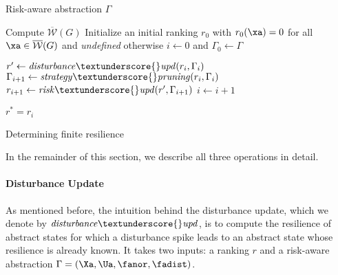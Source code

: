 \begin{algorithm}
	\begin{algorithmic}[1]
		\INPUT Risk-aware abstraction $\Gamma$
		
		\State Compute $\overline{\mathcal W}(G)$
		\State Initialize an initial ranking $r_0$ with $r_0(\xa) = 0$ for all $\xa \in \overline{\mathcal W}(G)$ and \emph{undefined} otherwise
		\State $i \gets 0$ and $\Gamma_0 \gets \Gamma$
		
		\Repeat
			\State $r' \gets \mathit{disturbance\textunderscore{}upd}(r_i, \Gamma_i)$
			\State $\Gamma_{i+1} \gets \mathit{strategy\textunderscore{}pruning}(r_i,\Gamma_i)$
			\State $r_{i+1} \gets \mathit{risk\textunderscore{}upd}(r', \Gamma_{i+1})$
			\State $i \gets i + 1$

		\State \Return $r^\ast = r_i$

	\end{algorithmic}
	\caption{Determining finite resilience} \label{alg:computing-finite-resilience}
\end{algorithm}

In the remainder of this section, we describe all three operations in detail. %

\paragraph{Disturbance Update}
As mentioned before, the intuition behind the disturbance update, which we denote by $\mathit{disturbance\textunderscore{}upd}$, is to compute the resilience of abstract states for which a disturbance spike leads to an abstract state whose resilience is already known.
It takes two inputs: a ranking $r$ and a risk-aware abstraction $\Gamma = (\Xa, \Ua, \fanor, \fadist)$.

